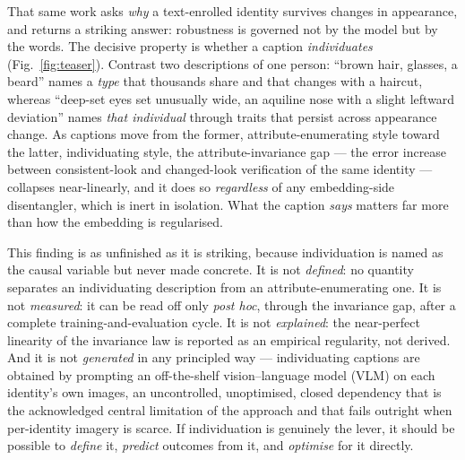 \documentclass[10pt,twocolumn,letterpaper]{article}
\begin{document}
That same work asks \emph{why} a text-enrolled identity survives changes in appearance, and
returns a striking answer: robustness is governed not by the model but by the words. The
decisive property is whether a caption \emph{individuates} (Fig.~\ref{fig:teaser}). Contrast two descriptions of one
person: ``brown hair, glasses, a beard'' names a \emph{type} that thousands share and that
changes with a haircut, whereas ``deep-set eyes set unusually wide, an aquiline nose with a
slight leftward deviation'' names \emph{that individual} through traits that persist across
appearance change. As captions move from the former, attribute-enumerating style toward the
latter, individuating style, the attribute-invariance gap --- the error increase between
consistent-look and changed-look verification of the same identity --- collapses near-linearly,
and it does so \emph{regardless} of any embedding-side disentangler, which is inert in isolation.
What the caption \emph{says} matters far more than how the embedding is regularised.

This finding is as unfinished as it is striking, because individuation is named as the causal
variable but never made concrete. It is not \emph{defined}: no quantity separates an
individuating description from an attribute-enumerating one. It is not \emph{measured}: it can be
read off only \emph{post hoc}, through the invariance gap, after a complete
training-and-evaluation cycle. It is not \emph{explained}: the near-perfect linearity of the
invariance law is reported as an empirical regularity, not derived. And it is not
\emph{generated} in any principled way --- individuating captions are obtained by prompting an
off-the-shelf vision--language model (VLM) on each identity's own images, an uncontrolled,
unoptimised, closed dependency that is the acknowledged central limitation of the approach and
that fails outright when per-identity imagery is scarce. If individuation is genuinely the lever,
it should be possible to \emph{define} it, \emph{predict} outcomes from it, and \emph{optimise}
for it directly.
\end{document}
